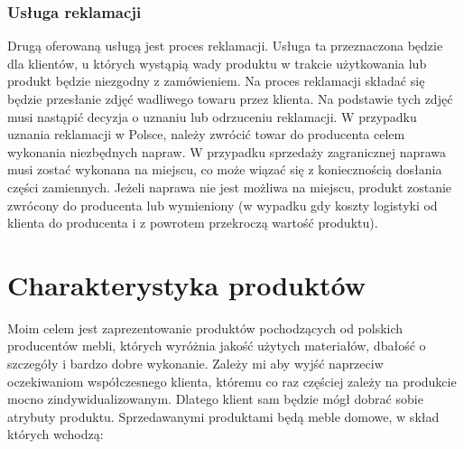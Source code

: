 		\subsubsection{Usługa reklamacji} 
			\par Drugą oferowaną usługą jest proces reklamacji. Usługa ta przeznaczona będzie dla klientów, u których wystąpią wady produktu w trakcie użytkowania lub produkt będzie niezgodny z zamówieniem. Na proces reklamacji składać się będzie przesłanie zdjęć wadliwego towaru przez klienta. Na podstawie tych zdjęć musi nastąpić decyzja o uznaniu lub odrzuceniu reklamacji. W przypadku uznania reklamacji w Polsce, należy zwrócić towar do producenta celem wykonania  niezbędnych napraw. W przypadku sprzedaży zagranicznej naprawa musi zostać wykonana na miejscu, co może wiązać się z koniecznością dosłania części zamiennych. Jeżeli naprawa nie jest możliwa na miejscu, produkt zostanie zwrócony do producenta lub wymieniony (w wypadku gdy koszty logistyki od klienta do producenta i z powrotem przekroczą wartość produktu).

	\section{Charakterystyka produktów}
		\par Moim celem jest zaprezentowanie produktów pochodzących od polskich producentów mebli, których wyróżnia jakość  użytych materiałów, dbałość o szczegóły i bardzo dobre wykonanie. Zależy mi aby wyjść naprzeciw oczekiwaniom współczesnego klienta, któremu co raz częściej zależy na produkcie mocno zindywidualizowanym. Dlatego klient sam będzie mógł dobrać sobie atrybuty produktu. Sprzedawanymi produktami będą meble domowe, w skład których wchodzą: 
	
